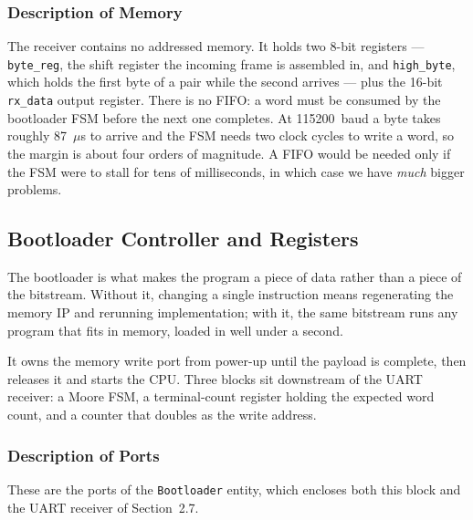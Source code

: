 \documentclass[11pt,letterpaper]{article}
\begin{document}
\subsubsection{Description of Memory}
The receiver contains no addressed memory. It holds two 8-bit registers ---
\texttt{byte\_reg}, the shift register the incoming frame is assembled in, and
\texttt{high\_byte}, which holds the first byte of a pair while the second
arrives --- plus the 16-bit \texttt{rx\_data} output register. There is no
FIFO: a word must be consumed by the bootloader FSM before the next one
completes. At 115200~baud a byte takes roughly 87~$\mu$s to arrive and the FSM
needs two clock cycles to write a word, so the margin is about four orders of
magnitude. A FIFO would be needed only if the FSM were to stall for tens of milliseconds,
in which case we have \textit{much} bigger problems. 

\subsection{Bootloader Controller and Registers}
The bootloader is what makes the program a piece of data rather than a piece of
the bitstream. Without it, changing a single instruction means regenerating the
memory IP and rerunning implementation; with it, the same bitstream runs any
program that fits in memory, loaded in well under a second.

It owns the memory write port from power-up until the payload is complete, then
releases it and starts the CPU. Three blocks sit downstream of the UART
receiver: a Moore FSM, a terminal-count register holding the expected word
count, and a counter that doubles as the write address.

\subsubsection{Description of Ports}
These are the ports of the \texttt{Bootloader} entity, which encloses both this
block and the UART receiver of Section~2.7.
\end{document}
